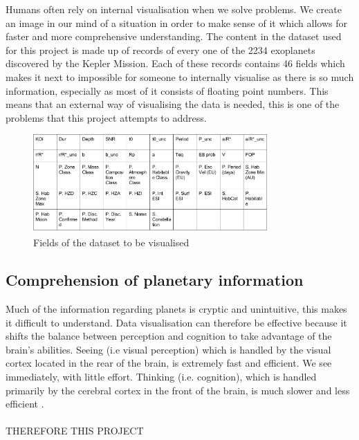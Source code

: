 Humans often rely on internal visualisation when we solve problems. We create an
image in our mind of a situation in order to make sense of it
\cite{visualisingpiggott} which allows for faster and more comprehensive
understanding. The content in the dataset used
for this project is made up of records of every one of the 2234 exoplanets
discovered by the Kepler Mission. Each of these records contains 46 fields which
makes it next to impossible for someone to internally visualise as there is so
much information, especially as most of it consists of floating point numbers.
This means that an external
way of visualising the data is needed, this is one of the problems that this
project
attempts to address. 
\begin{figure}[H]
  \centering
      \includegraphics[width=0.8\textwidth]{images/data.png}
  \caption{Fields of the dataset to be visualised}
\end{figure}

\subsection{Comprehension of planetary information}
Much of the information regarding planets is cryptic and unintuitive, this makes
it difficult to understand. Data visualisation can therefore be effective
because it shifts the balance between perception and cognition to take advantage
of
the brain's abilities. Seeing (i.e visual perception) which is handled by the
visual cortex located in the rear of the brain, is extremely fast and efficient.
We see immediately, with little effort. Thinking (i.e. cognition), which is
handled primarily by the cerebral cortex in the front of the brain, is much
slower and less efficient \cite{few}.
\\\\
THEREFORE THIS PROJECT

